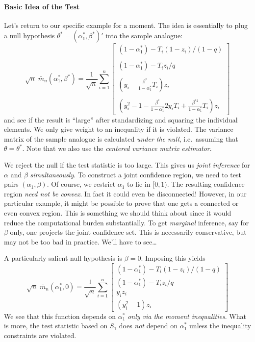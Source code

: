 \documentclass[12pt]{article}
\begin{document}
\paragraph{Basic Idea of the Test}
Let's return to our specific example for a moment.
The idea is essentially to plug a null hypothesis $\theta^* = (\alpha_1^*, \beta^*)'$ into the sample analogue:
\[
  \sqrt{n}\; \bar{m}_n(\alpha_1^*, \beta^*) = \frac{1}{\sqrt{n}}\sum_{i=1}^n
  \left[
  \begin{array}{r}
    (1 - \alpha_1^*) - T_i (1 - z_i)/(1-q)\\ \\
    (1 - \alpha_1^*) - T_i z_i/q\\ \\
    \left(y_i - \displaystyle\frac{\beta^*}{1 - \alpha_1^*}T_i\right) z_i \\ \\
    \left( y_i^2 - 1 - \displaystyle \frac{\beta^*}{1 - \alpha_1^*} 2y_i T_i + \displaystyle\frac{\beta^{*2}}{1 - \alpha_1^*}T_i\right)z_i 
  \end{array}
\right]
\]
and see if the result is ``large'' after standardizing and squaring the individual elements.
We only give weight to an inequality if it is violated.
The variance matrix of the sample analogue is calculated \emph{under the null}, i.e.\ assuming that $\theta = \theta^*$.
Note that we also use the \emph{centered variance matrix estimator}.

We reject the null if the test statistic is too large.
This gives us \emph{joint inference} for $\alpha$ and $\beta$ \emph{simultaneously}.
To construct a joint confidence region, we need to test pairs $(\alpha_1, \beta)$.
Of course, we restrict $\alpha_1$ to lie in $[0, 1)$.
The resulting confidence region \emph{need not be convex}.
In fact it could even be disconnected!
However, in our particular example, it might be possible to prove that one gets a connected or even convex region.
This is something we should think about since it would reduce the computational burden substantially.
To get \emph{marginal} inference, say for $\beta$ only, one projects the joint confidence set.
This is necessarily conservative, but may not be too bad in practice. 
We'll have to see\ldots

A particularly salient null hypothesis is $\beta = 0$.
Imposing this yields
\[
  \sqrt{n}\; \bar{m}_n(\alpha_1^*, 0) = \frac{1}{\sqrt{n}}\sum_{i=1}^n
  \left[
  \begin{array}{r}
    (1 - \alpha_1^*) - T_i (1 - z_i)/(1-q)\\ 
    (1 - \alpha_1^*) - T_i z_i/q\\ 
    y_i z_i \\ 
    \left( y_i^2 - 1 \right)z_i 
  \end{array}
\right]
\]
We see that this function depends on $\alpha_1^*$ \emph{only via the moment inequalities}.
What is more, the test statistic based on $S_1$ does \emph{not} depend on $\alpha_1^*$ unless the inequality constraints are violated.
\end{document}

